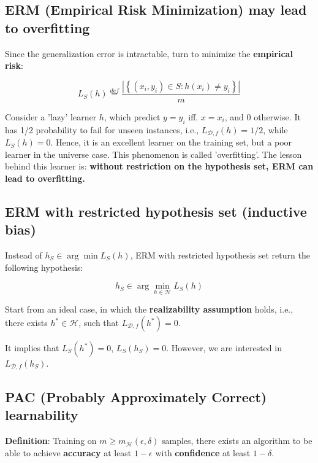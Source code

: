 \documentclass{article}
\begin{document}
\subsection{ERM (Empirical Risk Minimization) may lead to overfitting}

	Since the generalization error is intractable, turn to minimize the \textbf{empirical risk}:

	\begin{equation}
	L_S(h)\overset{def}{=}\frac{|\left\{(x_i,y_i)\in S:h(x_i)\neq y_i \right\}|}{m}
	\end{equation}

	Consider a 'lazy' learner $h$, which predict $y=y_i$ iff. $x=x_i$, and 0 otherwise. It has 1/2 probability to fail for unseen instances, i.e., $L_{\mathcal{D},f}(h)=1/2$, while $L_S(h)=0$. Hence, it is an excellent learner on the training set, but a poor learner in the universe case. This phenomenon is called 'overfitting'. The lesson behind this learner is: \textbf{without restriction on the hypothesis set, ERM can lead to overfitting.}

\subsection{ERM with restricted hypothesis set (inductive bias)}

	Instead of $h_S\in \arg\min L_S(h)$, ERM with restricted hypothesis set return the following hypothesis:
	
	\begin{equation}
	h_S\in \arg\min \limits_{h\in\mathcal{H}}L_S(h)
	\end{equation}

	Start from an ideal case, in which the \textbf{realizability assumption} holds, i.e., there exists $h^*\in\mathcal{H}$, such that $L_{\mathcal{D},f}(h^*) = 0$.
	
	It implies that $L_S(h^*)=0$, $L_S(h_S)=0$. However, we are interested in $L_{\mathcal{D},f}(h_S)$.

\subsection{PAC (Probably Approximately Correct) learnability}

	\textbf{Definition}: Training on $m\geq m_\mathcal{H}(\epsilon,\delta)$ samples, there exists an algorithm to be able to achieve \textbf{accuracy} at least $1-\epsilon$ with \textbf{confidence} at least $1-\delta$.
	
\end{document}
